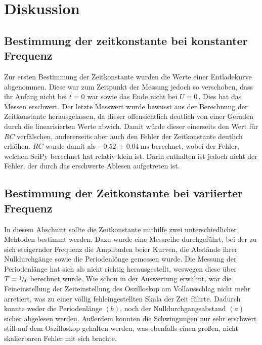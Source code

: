 \section{Diskussion}
\label{sec:Diskussion}
\subsection{Bestimmung der zeitkonstante bei konstanter Frequenz}
Zur ersten Bestimmung der Zeitkonstante wurden die Werte einer Entladekurve abgenommen.
Diese war zum Zeitpunkt der Messung jedoch so verschoben, dass ihr Anfang nicht bei $t=0$
war sowie das Ende nicht bei $U=0$\,. Dies hat das Messen erschwert. Der letzte Messwert
wurde bewusst aus der Berechnung der Zeitkonstante herausgelassen, da dieser offensichtlich 
deutlich von einer Geraden durch die linearisierten Werte abwich. Damit würde dieser einerseits
den Wert für $RC$ verfälschen, andererseits aber auch den Fehler der Zeitkonstante deutlich
erhöhen. $RC$ wurde damit als $\qty{-0,52(0.04)}{\milli\second}$ berechnet, wobei der Fehler,
welchen SciPy berechnet hat relativ klein ist. Darin enthalten ist jedoch nicht der Fehler, der 
durch das erschwerte Ablesen aufgetreten ist. 
\subsection{Bestimmung der Zeitkonstante bei variierter Frequenz}
In diesem Abschnitt sollte die Zeitkonstante mithilfe zwei unterschiedlicher Mehtoden bestimmt werden.
Dazu wurde eine Messreihe durchgeführt, bei der zu sich steigernder Frequenz die Amplituden beier Kurven,
die Abstände ihrer Nulldurchgänge sowie die Periodenlönge gemessen wurde. Die Messung der Periodenlänge 
hat sich als nicht richtig herausgestellt, weswegen diese über $T=\sfrac{1}{f}$ berechnet wurde.
Wie schon in der Auswertung erwähnt, war die Feineinstellung der Zeiteinstellung des Oszilloskop am 
Vollausschlag nicht mehr arretiert, was zu einer völlig fehleingestellten Skala der Zeit führte. Dadurch 
konnte weder die Periodenlänge $(b)$, noch der Nulldurchgangsabstand $(a)$ sicher abgelesen werden. 
Außerdem konnten die Schwingungen nur sehr erschwert still auf dem Oszilloskop gehalten werden, was
ebenfalls einen großen, nicht skalierbaren Fehler mit sich brachte. 